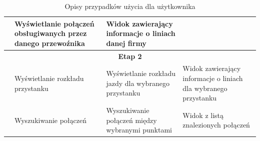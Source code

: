 \documentclass[10pt,a4paper]{article}
\begin{document}
\begin{table}[H]
\begin{tabularx}{\textwidth}{|c|X|X|X|}
		& Wyświetlanie połączeń obsługiwanych przez danego przewoźnika
		& Widok zawierający informacje o liniach danej firmy \\
		\hline
		\multicolumn{4}{|c|}{\textbf{Etap 2}} \\
		\hline
		\multirow{5}{*}{\rotatebox[origin=c]{90}{Pracownik}}
		& Wyświetlanie rozkładu przystanku
		& Wyświetlanie rozkładu jazdy dla wybranego przystanku
		& Widok zawierający informacje o liniach dla wybranego przystanku \\
		\cline{2-4}
		& Wyszukiwanie połączeń
		& Wyszukiwanie połączeń między wybranymi punktami
		& Widok z listą znalezionych połączeń \\
		\hline
	\end{tabularx}
	\caption{Opisy przypadków użycia dla użytkownika}
\end{table}
\end{document}
